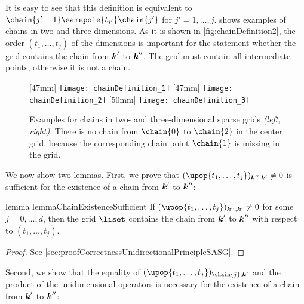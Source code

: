 It is easy to see that this definition is equivalent to
$\chain{j'-1} \samepole{t_{j'}} \chain{j'}$ for $j' = 1, \dotsc, j$.
 shows examples of chains in
two and three dimensions.
As it is shown in \cref{fig:chainDefinition2},
the order $(t_1, \dotsc, t_j)$ of the dimensions is important
for the statement whether the grid contains the chain from
${\boldsymbol{k}}'$ to ${\boldsymbol{k}}''$.
The grid must contain all intermediate points, otherwise
it is not a chain.

\begin{figure}
  [47mm]{%
    \texttt{[image: chainDefinition\_1]}%
    \label{fig:chainDefinition1}%
  }%
  \hfill%
  [47mm]{%
    \texttt{[image: chainDefinition\_2]}%
    \label{fig:chainDefinition2}%
  }%
  \hfill%
  [50mm]{%
    \texttt{[image: chainDefinition\_3]}%
  }%
  \caption[%
    Examples for the definition of chains%
  ]{%
    Examples for chains in two- and three-dimensional
    sparse grids \emph{(left, right)}.
    There is no chain from $\chain{0}$ to $\chain{2}$ in the center grid,
    because the corresponding chain point $\chain{1}$ is missing in the grid.%
  }%
  \label{fig:chainDefinition}%
\end{figure}

We now show two lemmas.
First, we prove that $(\upop{t_1,\dotsc,t_j})_{\*k'',\*k'} \not= 0$
is sufficient for the existence of a chain from ${\boldsymbol{k}}'$ to ${\boldsymbol{k}}''$:

\begin{restatable}{%
  lemma%
}{%
  lemmaChainExistenceSufficient%
}
  \label{lemma:chainExistenceSufficient}
  If $(\upop{t_1,\dotsc,t_j})_{\*k'',\*k'} \not= 0$
  for some $j = 0, \dotsc, d$,
  then the grid $\liset$ contains the chain from ${\boldsymbol{k}}'$ to ${\boldsymbol{k}}''$
  with respect to $(t_1, \dotsc, t_j)$.
\end{restatable}

\begin{proof}
  See \cref{sec:proofCorrectnessUnidirectionalPrincipleSASG}.
\end{proof}

Second, we show that the equality of
$(\upop{t_1,\dotsc,t_j})_{\chain{j},\*k'}$ and the product of
the unidimensional operators is necessary for the
existence of a chain from ${\boldsymbol{k}}'$ to ${\boldsymbol{k}}''$:


